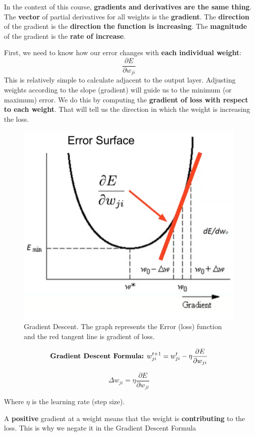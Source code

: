 \begin{idea}
    In the context of this course, \textbf{gradients and derivatives are the same thing}. The \textbf{vector} of partial derivatives for all weights is the \textbf{gradient}. The \textbf{direction} of the gradient is the \textbf{direction the function is increasing}. The \textbf{magnitude} of the gradient is the \textbf{rate of increase}.
\end{idea}

First, we need to know how our error changes with \textbf{each individual weight}:
\[\frac{\partial E}{\partial w_{ji}}\]
This is relatively simple to calculate adjacent to the output layer. Adjusting weights according to the slope (gradient) will guide us to the minimum (or maximum) error. We do this by computing the \textbf{gradient of loss with respect to each weight}. That will tell us the direction in which the weight is increasing the loss.


\begin{figure}[h!t]
    \centering
    \includegraphics[width=0.5\linewidth]{gradientdescent.png}
    \caption{Gradient Descent. The graph represents the Error (loss) function and the red tangent line is gradient of loss.}
    \label{fig:enter-label}
\end{figure}


\[ \text{\textbf{Gradient Descent Formula:}    } w_{ji}^{t+1} = w_{ji}^{t} - \eta \frac{\partial E}{\partial w_{ji}}\]


\[\Delta w_{ji} = \eta \frac{\partial E}{\partial w_{ji}}\]


Where \(\eta\) is the learning rate (step size).\\

\begin{idea}
    A \textbf{positive} gradient at a weight means that the weight is\textbf{ contributing} to the loss. This is why we negate it in the Gradient Descent Formula
\end{idea}

